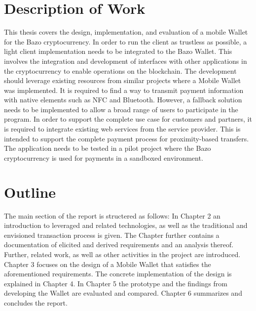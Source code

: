 \section{Description of Work}
This thesis covers the design, implementation, and evaluation of a mobile Wallet for the Bazo cryptocurrency. In order to run the client as trustless as possible, a light client implementation needs to be integrated to the Bazo Wallet. This involves the integration and development of interfaces with other applications in the cryptocurrency to enable operations on the blockchain.
The development should leverage existing resources from similar projects where a Mobile Wallet was implemented.
It is required to find a way to transmit payment information with native elements such as NFC and Bluetooth. However, a fallback solution needs to be implemented to allow a broad range of users to participate in the program.
In order to support the complete use case for customers and partners, it is required to integrate existing web services from the service provider. This is intended to support the complete payment process for proximity-based transfers.
The application needs to be tested in a pilot project where the Bazo cryptocurrency is used for payments in a sandboxed environment.

\section{Outline}
The main section of the report is structered as follows:
In Chapter 2 an introduction to leveraged and related technologies, as well as the traditional and envisioned transaction process is given. The Chapter further contains a documentation of elicited and derived requirements and an analysis thereof. Further, related work, as well as other activities in the project are introduced. Chapter 3 focuses on the design of a Mobile Wallet that satisfies the aforementioned requirements. The concrete implementation of the design is explained in Chapter 4. In Chapter 5 the prototype and the findings from developing the Wallet are evaluated and compared.
Chapter 6 summarizes and concludes the report.